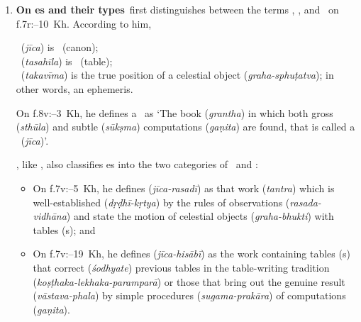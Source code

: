 \begin{enumerate}[topsep=0pt]
\begin{multicols}{2}
     \textit{kāranāmai-sāhiba-kirāna-sānī \newline jīca-śāha-jahānī}
    \end{multicols}
    \item \textbf{On \zij es and their types}\label{zij_types_defintion_siddhantasindhu}\quad    \Nityananda\ first distinguishes between the terms \zij, \tashil, and \taqvim\ on f.\thinspace 7r:--10~Kh. According to him,
    \begin{multicols}{2}
     \columnbreak

    \zij\ (\textit{jīca}) is \Siddhanta\ (canon);\\
    \tashil\ (\textit{tasahīla}) is \sarani\ (table);\\ \taqvim\ (\textit{takavīma}) is the true position of a celestial object (\textit{graha-sphuṭatva}); in other words, an ephemeris.
    \end{multicols}
    On f.\thinspace 8v:--3~Kh, he defines a \zij\ as  `The book (\textit{grantha}) in which both gross (\textit{sthūla}) and subtle (\textit{sūkṣma}) computations (\textit{gaṇita}) are found, that is called a \zij\ (\textit{jīca})'.   
    
    \Nityananda, like \MullaFarid, also classifies \zij es into the two categories of \zijiRasadi\ and \zijiHisabi: 
    \begin{itemize}
            \item On f.\thinspace 7v:--5~Kh, he defines  (\textit{jīca-rasadī}) as that work (\textit{tantra}) which is well-established (\textit{dṛḍhī-kṛtya}) by the rules of observations (\textit{rasada-vidhāna}) and state the motion of celestial objects (\textit{graha-bhukti}) with tables (\kosthaka s); and
            \item On f.\thinspace 7v:--19~Kh, he defines  (\textit{jīca-hisābī}) as the work containing tables (\kosthaka s) that correct (\textit{śodhyate}) previous tables in the table-writing tradition (\textit{koṣṭhaka-lekhaka-paramparā}) or those that bring out the genuine result (\textit{vāstava-phala}) by simple procedures (\textit{sugama-prakāra}) of computations (\textit{gaṇita}). 
        \end{itemize}


\end{enumerate}
